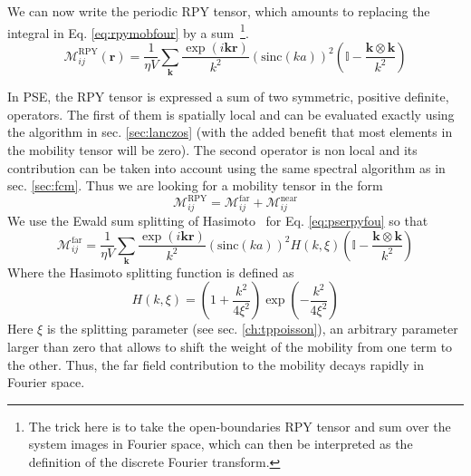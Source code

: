 \documentclass[ twoside,openright,titlepage,numbers=noenddot,%
headinclude,footinclude,cleardoublepage=empty,abstract=on,
BCOR=5mm,paper=b5,fontsize=11pt, dvipsnames
]{scrreprt}
\renewcommand{\vec}[1]{\bm{#1}}
\newcommand{\tens}[1]{\bm{\mathcal{#1}}}
\newcommand{\sinc}{\textrm{sinc}}
\newcommand{\near}{\textrm{near}}
\newcommand{\far}{\textrm{far}}
\begin{document}
We can now write the periodic \gls{RPY} tensor, which amounts to replacing the integral in Eq. \eqref{eq:rpymobfour} by a sum~\cite{Fiore2017}\footnote{The trick here is to take the open-boundaries \gls{RPY} tensor and sum over the system images in Fourier space, which can then be interpreted as the definition of the discrete Fourier transform.}.
\begin{equation}
  \label{eq:pserpyfou}
  \tens{M}_{ij}^{\textrm{RPY}}(\vec{r})= \frac{1}{\eta V} \sum_{\vec{k}} \frac{\exp(i\vec{k}\vec{r})}{k^2}\left(\sinc(ka) \right)^2\left(\mathbb{I} - \frac{\vec{k}\otimes\vec{k}}{k^2}\right)
\end{equation}

In \gls{PSE}, the \gls{RPY} tensor is expressed a sum of two symmetric, positive definite, operators. The first of them is spatially local and can be evaluated exactly using the algorithm in sec. \ref{sec:lanczos} (with the added benefit that most elements in the mobility tensor will be zero). The second operator is non local and its contribution can be taken into account using the same spectral algorithm as in sec. \ref{sec:fcm}.
Thus we are looking for a mobility tensor in the form
\begin{equation}
  \label{eq:psemobsep}
  \tens{M}_{ij}^{\textrm{RPY}} = \tens{M}_{ij}^{\far} + \tens{M}^{ \near}_{ij}
\end{equation}
We use the Ewald sum splitting of Hasimoto~\cite{Hasimoto1959} for Eq. \eqref{eq:pserpyfou} so that
\begin{equation}
  \label{eq:pserpyfar}
  \tens{M}_{ij}^{\far}= \frac{1}{\eta V} \sum_{\vec{k}} \frac{\exp(i\vec{k}\vec{r})}{k^2}\left(\sinc(ka) \right)^2H(k,\xi)\left(\mathbb{I} - \frac{\vec{k}\otimes\vec{k}}{k^2}\right)
\end{equation}
Where the Hasimoto splitting function is defined as
\begin{equation}
  \label{eq:psehasimoto}
  H(k,\xi) = \left(1 + \frac{k^2}{4\xi^2}\right)\exp\left(-\frac{k^2}{4\xi^2}\right)
\end{equation}
Here $\xi$ is the splitting parameter (see sec. \ref{ch:tppoisson}), an arbitrary parameter larger than zero that allows to shift the weight of the mobility from one term to the other. Thus, the far field contribution to the mobility decays rapidly in Fourier space.
\end{document}
